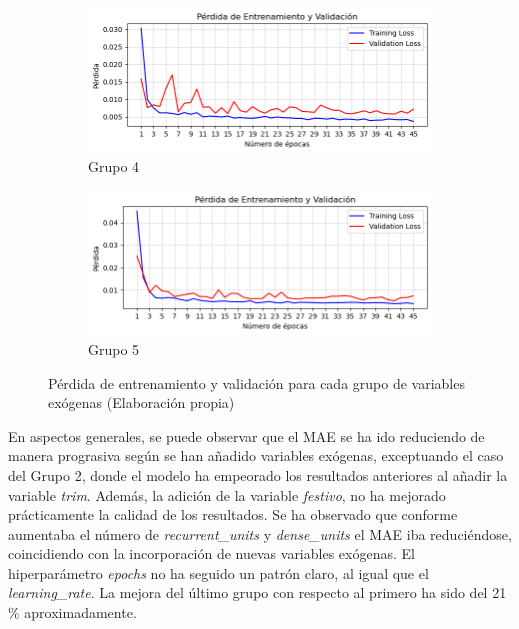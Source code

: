 \documentclass[12pt,a4paper]{report}
\begin{document}
\begin{figure}[H]
    \begin{subfigure}{0.45\textwidth}
        \centering
        \includegraphics[width=\textwidth]{Images/tfm-4.6.4.png}
        \caption{Grupo 4}
    \end{subfigure}
    \begin{subfigure}{0.45\textwidth}
        \centering
        \includegraphics[width=\textwidth]{Images/tfm-4.6.5.png}
        \caption{Grupo 5}
    \end{subfigure}
    \caption{Pérdida de entrenamiento y validación para cada grupo de variables exógenas (Elaboración propia)}
    \label{fig:figura_EVSV}
\end{figure}

En aspectos generales, se puede observar que el MAE se ha ido reduciendo de manera prograsiva según se han añadido variables exógenas, exceptuando el caso del Grupo 2, donde el modelo ha empeorado los resultados anteriores al añadir la variable \textit{trim}. Además, la adición de la variable \textit{festivo}, no ha mejorado prácticamente la calidad de los resultados. Se ha observado que conforme aumentaba el número de \textit{recurrent\_units} y \textit{dense\_units} el MAE iba reduciéndose, coincidiendo con la incorporación de nuevas variables exógenas. El hiperparámetro \textit{epochs} no ha seguido un patrón claro, al igual que el \textit{learning\_rate}. La mejora del último grupo con respecto al primero ha sido del 21$\%$ aproximadamente.
\end{document}

